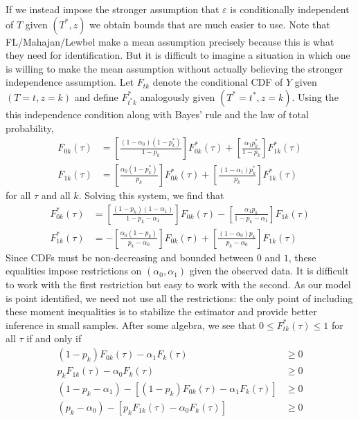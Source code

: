 \documentclass[12pt]{article}
\begin{document}
If we instead impose the stronger assumption that $\varepsilon$ is conditionally independent of $T$ given $(T^*,z)$ we obtain bounds that are much easier to use.
Note that FL/Mahajan/Lewbel make a mean assumption precisely because this is what they need for identification.
But it is difficult to imagine a situation in which one is willing to make the mean assumption without actually believing the stronger independence assumption. 
Let $F_{tk}$ denote the conditional CDF of $Y$ given $(T=t,z=k)$ and define $F^*_{t^*k}$ analogously given $(T^*=t^*,z=k)$.
Using the this independence condition along with Bayes' rule and the law of total probability, 
\begin{align*}
  F_{0k}(\tau) &= \left[ \frac{(1 - \alpha_0)(1 - p_k^*)}{1 - p_k} \right] F_{0k}^*(\tau) + \left[ \frac{\alpha_1 p_k^*}{1 - p_k} \right] F_{1k}^*(\tau) \\
  F_{1k}(\tau) &= \left[ \frac{\alpha_0(1 - p_k^*)}{p_k} \right] F_{0k}^*(\tau) + \left[ \frac{(1 - \alpha_1) p_k^*}{p_k} \right] F_{1k}^*(\tau) 
\end{align*}
for all $\tau$ and all $k$.
Solving this system, we find that
\begin{align*}
  F_{0k}^*(\tau) &= \left[ \frac{(1 - p_k)(1 - \alpha_1)}{1 - p_k - \alpha_1} \right] F_{0k}(\tau) - \left[ \frac{\alpha_1 p_k}{1 - p_k - \alpha_1} \right] F_{1k}(\tau) \\
  F_{1k}^*(\tau) &= -\left[ \frac{\alpha_0(1 - p_k)}{p_k - \alpha_0} \right] F_{0k}(\tau) + \left[ \frac{(1 - \alpha_0)p_k}{p_k - \alpha_0} \right] F_{1k}(\tau)
\end{align*}
Since CDFs must be non-decreasing and bounded between $0$ and $1$, these equalities impose restrictions on $(\alpha_0, \alpha_1)$ given the observed data.
It is difficult to work with the first restriction but easy to work with the second.
As our model is point identified, we need not use all the restrictions: the only point of including these moment inequalities is to stabilize the estimator and provide better inference in small samples.
After some algebra, we see that $0\leq F^*_{tk}(\tau) \leq 1$ for all $\tau$ if and only if
\begin{align*}
  (1 - p_k) F_{0k}(\tau) - \alpha_1 F_k(\tau) &\geq 0\\
  p_k F_{1k}(\tau) - \alpha_0 F_k(\tau) &\geq 0 \\
(1 - p_k - \alpha_1) - \left[(1 - p_k) F_{0k}(\tau) - \alpha_1 F_k(\tau)\right] &\geq 0 \\
  (p_k - \alpha_0) - \left[p_k F_{1k}(\tau) - \alpha_0 F_k(\tau)\right] &\geq 0
\end{align*}
\end{document}
